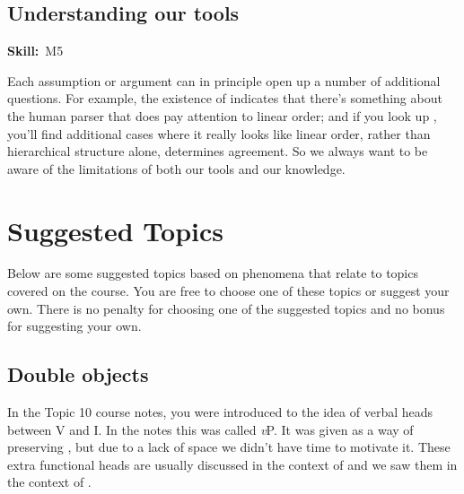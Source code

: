 \documentclass{article}
\begin{document}
\subsection{Understanding our tools}
\hfill{}\textbf{Skill:}~M5%

Each assumption or argument can in principle open up a number of additional questions. For example, the existence of  indicates that there's something about the human parser that does pay attention to linear order; and if you look up , you'll find additional cases where it really looks like linear order, rather than hierarchical structure alone, determines agreement. So we always want to be aware of the limitations of both our tools and our knowledge.

\section{Suggested Topics}
Below are some suggested topics based on phenomena that relate to topics covered on the course. You are free to choose one of these topics or suggest your own. There is no penalty for choosing one of the suggested topics and no bonus for suggesting your own.



\subsection{Double objects}

In the Topic 10 course notes, you were introduced to the idea of verbal heads between V and I. In the notes this was called \emph{v}P.
It was given as a way of preserving , but due to a lack of space we didn't have time to motivate it.
These extra functional heads are usually discussed in the context of  and we saw them in the context of .
\begin{exe}
\end{exe}
\end{document}
